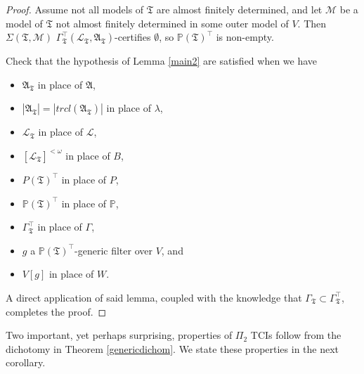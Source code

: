 \documentclass[12pt, twoside]{memoir}
\numberwithin{equation}{section}
\theoremstyle{definition}
\theoremstyle{remark}
\theoremstyle{definition}
\theoremstyle{definition}
\theoremstyle{definition}
\theoremstyle{remark}
\begin{document}
\begin{proof}
Assume not all models of $\mathfrak{T}$ are almost finitely determined, and let $\mathcal{M}$ be a model of $\mathfrak{T}$ not almost finitely determined in some outer model of $V$. Then $\Sigma(\mathfrak{T}, \mathcal{M})$ $\Gamma_{\mathfrak{T}}^{\top} (\mathcal{L}_{\mathfrak{T}}, \mathfrak{A}_{\mathfrak{T}})$-certifies $\emptyset$, so $\mathbb{P}(\mathfrak{T})^{\top}$ is non-empty.

Check that the hypothesis of Lemma \ref{main2} are satisfied when we have 
\begin{itemize}
    \item $\mathfrak{A}_{\mathfrak{T}}$ in place of $\mathfrak{A}$,
    \item $|\mathfrak{A}_{\mathfrak{T}}| = |trcl(\mathfrak{A}_{\mathfrak{T}})|$ in place of $\lambda$,
    \item $\mathcal{L}_{\mathfrak{T}}$ in place of $\mathcal{L}$,
    \item $[\mathcal{L}_{\mathfrak{T}}]^{< \omega}$ in place of $B$,
    \item $P(\mathfrak{T})^{\top}$ in place of $P$,
    \item $\mathbb{P}(\mathfrak{T})^{\top}$ in place of $\mathbb{P}$,
    \item $\Gamma_{\mathfrak{T}}^{\top}$ in place of $\Gamma$, 
    \item $g$ a $\mathbb{P}(\mathfrak{T})^{\top}$-generic filter over $V$, and
    \item $V[g]$ in place of $W$.
\end{itemize}
A direct application of said lemma, coupled with the knowledge that $\Gamma_{\mathfrak{T}} \subset \Gamma_{\mathfrak{T}}^{\top}$, completes the proof. 
\end{proof}

Two important, yet perhaps surprising, properties of $\Pi_2$ TCIs follow from the dichotomy in Theorem \ref{genericdichom}. We state these properties in the next corollary.
\end{document}
